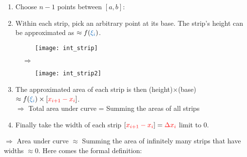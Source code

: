 \documentclass[class=article, crop=false, 12pt]{standalone}
\begin{document}
\begin{enumerate}
    \item Choose $n-1$ points between $[a,b]$:

    \item Within each strip, pick an arbitrary point  at its base. 
    The strip's height can be approximated as $\approx f(\blue{\xi_i})$.

    \begin{center}
        \begin{minipage}{0.3\textwidth}
            \centering
            \begin{figure}[h]
                \centering
                \texttt{[image: int\_strip]}
            \end{figure}
        \end{minipage}
        $\quad \Rightarrow \quad$
        \begin{minipage}{0.3\textwidth}
            \centering
            \begin{figure}[h]
                \centering
                \texttt{[image: int\_strip2]}
            \end{figure}
        \end{minipage}
    \end{center}
    

    \item The approximated area of each strip is then (height)$\times$(base) $\approx f(\blue{\xi_i})\times [\red{x_{i+1}-x_i}]$.\\
        $\Rightarrow$ Total area under curve = Summing the areas of all strips 

    \item Finally take the width of each strip $[{\color{red}{x_{i+1}-x_i}}] = {\color{red}{\Delta x_i}}$ limit to $0$. \\
        
\end{enumerate}

$\Rightarrow$ Area under curve $\approx$ Summing the area of infinitely many strips that have widths $\approx 0$. 
Here comes the formal definition:
\end{document}
